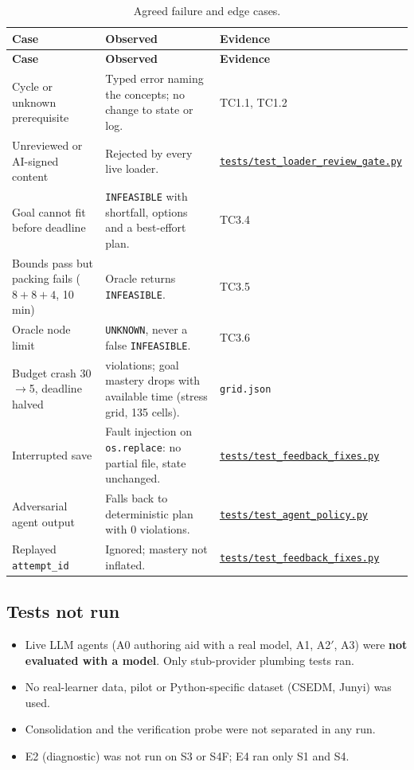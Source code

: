 \documentclass[11pt,a4paper]{article}
\newcommand{\finaltag}{cs5903-final-2026}
\newcommand{\repobase}{https://github.com/vhemanth06/AdaptEngine}
\newcommand{\repo}[1]{\href{\repobase/blob/\finaltag/#1}{\nolinkurl{#1}}}
\begin{document}
\begin{xltabular}{\textwidth}{
    @{}
    >{\raggedright\arraybackslash}p{0.3\textwidth}
    >{\raggedright\arraybackslash}X
    >{\raggedright\arraybackslash}p{0.25\textwidth}
    @{}
}
\caption{Agreed failure and edge cases.}
\label{tab:edge}\\
\toprule
\textbf{Case} & \textbf{Observed} & \textbf{Evidence} \\
\midrule
\endfirsthead
\toprule
\textbf{Case} & \textbf{Observed} & \textbf{Evidence} \\
\midrule
\endhead
\bottomrule
\endfoot
Cycle or unknown prerequisite & Typed error naming the concepts; no change to state or log. & TC1.1, TC1.2 \\
Unreviewed or AI-signed content & Rejected by every live loader. & \repo{tests/test_loader_review_gate.py} \\
Goal cannot fit before deadline & \texttt{INFEASIBLE} with shortfall, options and a best-effort plan. & TC3.4 \\
Bounds pass but packing fails ($8+8+4$, 10 min) & Oracle returns \texttt{INFEASIBLE}. & TC3.5 \\
Oracle node limit & \texttt{UNKNOWN}, never a false \texttt{INFEASIBLE}. & TC3.6 \\
Budget crash 30$\rightarrow$5, deadline halved & 0 violations; goal mastery drops with available time (stress grid, 135 cells). & \texttt{grid.json} \\
Interrupted save & Fault injection on \texttt{os.replace}: no partial file, state unchanged. & \repo{tests/test_feedback_fixes.py} \\
Adversarial agent output & Falls back to deterministic plan with 0 violations. & \repo{tests/test_agent_policy.py} \\
Replayed \texttt{attempt\_id} & Ignored; mastery not inflated. & \repo{tests/test_feedback_fixes.py} \\
\end{xltabular}

\subsection{Tests not run}

\begin{itemize}
\item Live LLM agents (A0 authoring aid with a real model, A1, A2$'$, A3) were \textbf{not evaluated with a model}. Only stub-provider plumbing tests ran.
\item No real-learner data, pilot or Python-specific dataset (CSEDM, Junyi) was used.
\item Consolidation and the verification probe were not separated in any run.
\item E2 (diagnostic) was not run on S3 or S4F; E4 ran only S1 and S4.
\end{itemize}
\end{document}
